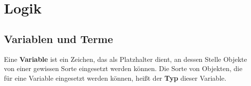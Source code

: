 

    

\chapter{Logik}


\section{Variablen und Terme}


\begin{comment}
\begin{defin}[Objekte und Typen]
    Ein \textbf{mathematisches Objekt} ist, nun ja, ein Objekt mit dem sich Mathematiker beschäftigen. Der Begriff stammt aus der Philosophie der Mathematik und ist absichtlich nicht streng umrissen. Als wichtigste und grundlegende Objekte lassen sich nennen: Zahlen, Funktionen, Mengen. Ein mathematisches Objekt „existiert“ nicht wirklich in der Realität, aber es lassen sich Abbilder anfertigen. So lassen sich Zahlen mit Kugeln an einem Abakus darstellen, lassen sich Geraden und Kreise mit einer Zeichnung skizzieren und eine reelle Funktion mit einem Plot ihres Funktionsgraphen. Diese Abbilder helfen uns beim Auffinden und Beurteilen mathematischer Sätze und Beweise. Für weiterführende Bemerkungen siehe \cref{anhang:philosophie}.

    In der \emph{Typentheorie} ist jedes Objekt von einem soganannten \textbf{Typ}. Insofern lässt sich ein Typ vorstellen als eine Art „Sorte“ von Objekten. Beim Begriff „Typ“ handelt es sich um einen Grundbegriff, der nicht auf noch grundlegenderen Begriffen aufbauend definiert wird.
\end{defin}


\begin{defin}[Variable] \label{def:variable} \index{Variable} \index{Typ einer Variable}
    Eine \textbf{Variable} ist ein Zeichen, das als Platzhalter dient, an dessen Stelle Objekte eines gewissen Typs (man spricht vom \emph{Typ dieser Variable}) eingesetzt werden können.
\end{defin}
\end{comment}


\begin{defin}[* Variable] \label{def:variable}  
    Eine \textbf{Variable} ist ein Zeichen, das als Platzhalter dient, an dessen Stelle Objekte von einer gewissen Sorte eingesetzt werden können. Die Sorte von Objekten, die für eine Variable eingesetzt werden können, heißt der \textbf{Typ} dieser Variable.
\end{defin}


